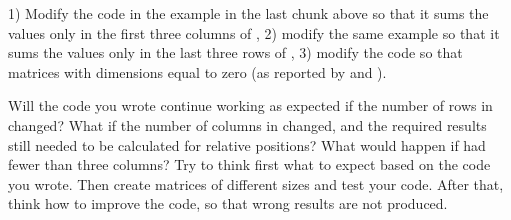 \documentclass[krantz2]{krantz}\usepackage{knitr}
\begin{document}
\begin{advplayground}
1) Modify the code in the example in the last chunk above so that it sums the values only in the first three columns of , 2) modify the same example so that it sums the values only in the last three rows of , 3) modify the code so that matrices with dimensions equal to zero (as reported by  and ).

Will the code you wrote continue working as expected if the number of rows in  changed? What if the number of columns in  changed, and the required results still needed to be calculated for relative positions? What would happen if  had fewer than three columns? Try to think first what to expect based on the code you wrote. Then create matrices of different sizes and test your code. After that, think how to improve the code, so that wrong results are not produced.
\end{advplayground}
\end{document}
